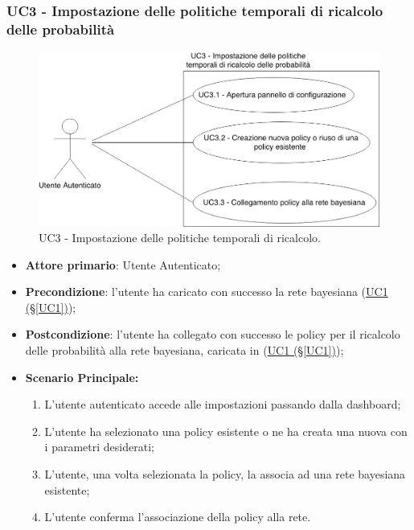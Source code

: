 \subsubsection{UC3 - Impostazione delle politiche temporali di ricalcolo delle probabilità}\label{UC3}

\begin{figure}[H]
\centering
\includegraphics[scale=0.3]{./images/UC3.png}
\caption{UC3 - Impostazione delle politiche temporali di ricalcolo.}
\end{figure}

\begin{itemize}
	\item \textbf{Attore primario}: Utente Autenticato; 
	\item \textbf{Precondizione}: l'utente ha caricato con successo la rete bayesiana (\hyperref[UC1]{UC1 (§\ref*{UC1})});
	\item \textbf{Postcondizione}: l'utente ha collegato con successo le policy per il ricalcolo delle probabilità alla rete bayesiana, caricata in (\hyperref[UC1]{UC1 (§\ref*{UC1})});	
	\item \textbf{Scenario Principale:}

	\begin{enumerate}
		\item L'utente autenticato accede alle impostazioni passando dalla dashboard;
		\item L'utente ha selezionato una policy esistente o ne ha creata una nuova con i parametri desiderati; 
		\item L'utente, una volta selezionata la policy, la associa  ad una rete bayesiana esistente;
		\item L'utente conferma l'associazione della policy alla rete.
	\end{enumerate}
	
\end{itemize}

